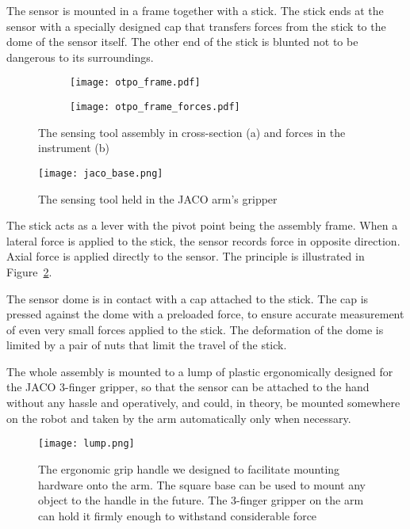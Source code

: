 \documentclass[buriama8_dp.tex]{subfiles}
\begin{document}
The sensor is mounted in a frame together with a stick. The stick ends at the sensor with a specially designed cap that transfers forces from the stick to the dome of the sensor itself. The other end of the stick is blunted not to be dangerous to its surroundings.

\begin{figure}[htp]
  \centering

  \begin{subfigure}[t]{0.44\textwidth}
   \texttt{[image: otpo\_frame.pdf]}
   \caption{\label{fig:opto_frame}}
  \end{subfigure}
  \begin{subfigure}[t]{0.44\textwidth}
   \texttt{[image: otpo\_frame\_forces.pdf]}
   \caption{\label{fig:frame_forces}}
  \end{subfigure}

 \caption[Sensing tool]{The sensing tool assembly in cross-section (a) and forces in the instrument (b)}
 \label{fig:opto_frame_fig}
\end{figure}


\begin{figure}[htp]
  \centering
  \hspace{2cm}\texttt{[image: jaco\_base.png]}
  \caption[Sensing tool]{The sensing tool held in the JACO arm's gripper}
  \label{fig:tool_photo} 
\end{figure}

The stick acts as a lever with the pivot point being the assembly frame. When a lateral force is applied to the stick, the sensor records force in opposite direction. Axial force is applied directly to the sensor. The principle is illustrated in Figure~\ref{fig:frame_forces}.

The sensor dome is in contact with a cap attached to the stick. The cap is pressed against the dome with a preloaded force, to ensure accurate measurement of even very small forces applied to the stick. The deformation of the dome is limited by a pair of nuts that limit the travel of the stick.

The whole assembly is mounted to a lump of plastic ergonomically designed for the JACO 3-finger gripper, so that the sensor can be attached to the hand without any hassle and operatively, and could, in theory, be mounted somewhere on the robot and taken by the arm automatically only when necessary.

\begin{figure}[ht]
  \centering
  \texttt{[image: lump.png]}
  \caption[Tool grip handle]{The ergonomic grip handle we designed to facilitate mounting hardware onto the arm. The square base can be used to mount any object to the handle in the future. The 3-finger gripper on the arm can hold it firmly enough to withstand considerable force}
  \label{fig:label}
\end{figure}
\end{document}
